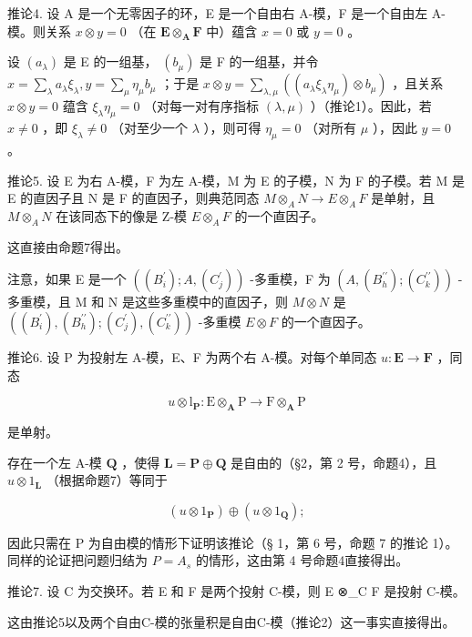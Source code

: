 推论4. 设 A 是一个无零因子的环，E 是一个自由右 A-模，F 是一个自由左 A-模。则关系 \(x \otimes y = 0\) （在 \(\mathbf{E} \otimes_{\mathbf{A}} \mathbf{F}\) 中）蕴含 \(x = 0\) 或 \(y = 0\) 。

设 \((a_{\lambda})\) 是 E 的一组基， \((b_{\mu})\) 是 F 的一组基，并令 \(x = \sum_{\lambda} a_{\lambda} \xi_{\lambda}, y = \sum_{\mu} \eta_{\mu} b_{\mu}\) ；于是 \(x \otimes y = \sum_{\lambda, \mu} ((a_{\lambda} \xi_{\lambda} \eta_{\mu}) \otimes b_{\mu})\) ，且关系 \(x \otimes y = 0\) 蕴含 \(\xi_{\lambda} \eta_{\mu} = 0\) （对每一对有序指标 \((\lambda, \mu)\) ）（推论1）。因此，若 \(x \neq 0\) ，即 \(\xi_{\lambda} \neq 0\) （对至少一个 \(\lambda\) ），则可得 \(\eta_{\mu} = 0\) （对所有 \(\mu\) ），因此 \(y = 0\) 。

推论5. 设 E 为右 A-模，F 为左 A-模，M 为 E 的子模，N 为 F 的子模。若 M 是 E 的直因子且 N 是 F 的直因子，则典范同态 \(M \otimes_{A} N \to E \otimes_{A} F\) 是单射，且 \(M \otimes_{A} N\) 在该同态下的像是 Z-模 \(E \otimes_{A} F\) 的一个直因子。

这直接由命题7得出。

注意，如果 E 是一个 \(((B_{i}^{\prime}); A, (C_{j}^{\prime}))\) -多重模，F 为 \((A, (B_{h}^{\prime\prime}); (C_{k}^{\prime\prime}))\) -多重模，且 M 和 N 是这些多重模中的直因子，则 \(M \otimes N\) 是 \(((B_{i}^{\prime}), (B_{h}^{\prime\prime}); (C_{j}^{\prime}), (C_{k}^{\prime\prime}))\) -多重模 \(E \otimes F\) 的一个直因子。

推论6. 设 P 为投射左 A-模，E、F 为两个右 A-模。对每个单同态 \(u: \mathbf{E} \to \mathbf{F}\) ，同态

\[
u \otimes \mathrm{l} _ {\mathbf {P}}: \mathrm{E} \otimes_ {\mathbf {A}} \mathrm{P} \rightarrow \mathrm{F} \otimes_ {\mathbf {A}} \mathrm{P}
\]

是单射。

存在一个左 A-模 \(\mathbf{Q}\) ，使得 \(\mathbf{L} = \mathbf{P} \oplus \mathbf{Q}\) 是自由的（§2，第 2 号，命题4），且 \(u \otimes 1_{\mathbf{L}}\) （根据命题7）等同于

\[
(u \otimes 1 _ {\mathbf {P}}) \oplus (u \otimes 1 _ {\mathbf {Q}});
\]

因此只需在 P 为自由模的情形下证明该推论（§ 1，第 6 号，命题 7 的推论 1）。同样的论证把问题归结为 \(P = A_{s}\) 的情形，这由第 4 号命题4直接得出。

推论7. 设 C 为交换环。若 E 和 F 是两个投射 C-模，则 E ⊗\_C F 是投射 C-模。

这由推论5以及两个自由C-模的张量积是自由C-模（推论2）这一事实直接得出。

